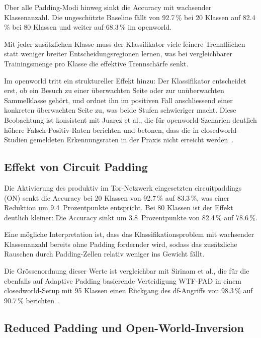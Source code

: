 Über alle Padding-Modi hinweg sinkt die Accuracy mit wachsender Klassenanzahl.
Die ungeschützte Baseline fällt von 92.7\,\% bei 20 Klassen auf 82.4\,\% bei 80 Klassen und weiter auf 68.3\,\% im \gls{openworld}.

Mit jeder zusätzlichen Klasse muss der Klassifikator viele feinere Trennflächen statt weniger breiter Entscheidungsregionen lernen, was bei vergleichbarer Trainingsmenge pro Klasse die effektive Trennschärfe senkt.

Im \gls{openworld} tritt ein struktureller Effekt hinzu: Der Klassifikator entscheidet erst, ob ein Besuch zu einer überwachten Seite oder zur unüberwachten Sammelklasse gehört, und ordnet ihn im positiven Fall anschliessend einer konkreten überwachten Seite zu, was beide Stufen schwieriger macht.
Diese Beobachtung ist konsistent mit Juarez et al., die für \gls{openworld}-Szenarien deutlich höhere Falsch-Positiv-Raten berichten und betonen, dass die in \gls{closedworld}-Studien gemeldeten Erkennungsraten in der Praxis nicht erreicht werden~\cite{juarez2014critical}.

\subsection{Effekt von Circuit Padding}
\label{sec:eval_padding_effekt}

Die Aktivierung des produktiv im Tor-Netzwerk eingesetzten \gls{circuitpadding}s (ON) senkt die Accuracy bei 20 Klassen von 92.7\,\% auf 83.3\,\%, was einer Reduktion um 9.4~Prozentpunkte entspricht.
Bei 80 Klassen ist der Effekt deutlich kleiner: Die Accuracy sinkt um 3.8~Prozentpunkte von 82.4\,\% auf 78.6\,\%.


Eine mögliche Interpretation ist, dass das Klassifikationsproblem mit wachsender Klassenanzahl bereits ohne Padding fordernder wird, sodass das zusätzliche Rauschen durch Padding-Zellen relativ weniger ins Gewicht fällt.


Die Grössenordnung dieser Werte ist vergleichbar mit Sirinam et al., die für die ebenfalls auf Adaptive Padding basierende Verteidigung WTF-PAD in einem \gls{closedworld}-Setup mit 95 Klassen einen Rückgang des \gls{df}-Angriffs von 98.3\,\% auf 90.7\,\% berichten~\cite{sirinam2018deep}.

\subsection{Reduced Padding und Open-World-Inversion}
\label{sec:eval_reduced}


